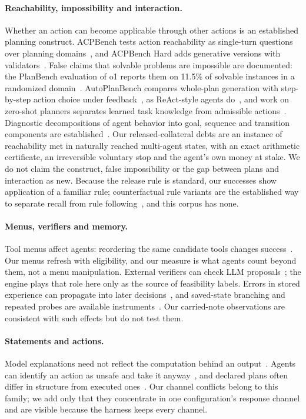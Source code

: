 \documentclass[10pt,twocolumn,letterpaper]{article}
\begin{document}
\paragraph{Reachability, impossibility and interaction.} Whether an action can become applicable through other actions is an established planning construct. ACPBench tests action reachability as single-turn questions over planning domains~\cite{kokel2025acpbench}, and ACPBench Hard adds generative versions with validators~\cite{kokel2026acpbenchhard}. False claims that solvable problems are impossible are documented: the PlanBench evaluation of o1 reports them on 11.5\% of solvable instances in a randomized domain~\cite{valmeekam2024o1,valmeekam2023planbench}. AutoPlanBench compares whole-plan generation with step-by-step action choice under feedback~\cite{stein2025autoplanbench}, as ReAct-style agents do~\cite{yao2023react}, and work on zero-shot planners separates learned task knowledge from admissible actions~\cite{huang2022zeroshot}. Diagnostic decompositions of agent behavior into goal, sequence and transition components are established~\cite{li2024eai}. Our released-collateral debts are an instance of reachability met in naturally reached multi-agent states, with an exact arithmetic certificate, an irreversible voluntary stop and the agent's own money at stake. We do not claim the construct, false impossibility or the gap between plans and interaction as new. Because the release rule is standard, our successes show application of a familiar rule; counterfactual rule variants are the established way to separate recall from rule following~\cite{wu2024reciting}, and this corpus has none.

\paragraph{Menus, verifiers and memory.} Tool menus affect agents: reordering the same candidate tools changes success~\cite{yan2026menu}. Our menus refresh with eligibility, and our measure is what agents count beyond them, not a menu manipulation. External verifiers can check LLM proposals~\cite{kambhampati2024modulo}; the engine plays that role here only as the source of feasibility labels. Errors in stored experience can propagate into later decisions~\cite{xiong2026memory}, and saved-state branching and repeated probes are available instruments~\cite{karpov2026mafiascope}. Our carried-note observations are consistent with such effects but do not test them.

\paragraph{Statements and actions.} Model explanations need not reflect the computation behind an output~\cite{turpin2023unfaithful,lanham2023faithfulness}. Agents can identify an action as unsafe and take it anyway~\cite{co2026atomic}, and declared plans often differ in structure from executed ones~\cite{oota2026declare}. Our channel conflicts belong to this family; we add only that they concentrate in one configuration's response channel and are visible because the harness keeps every channel.
\end{document}
